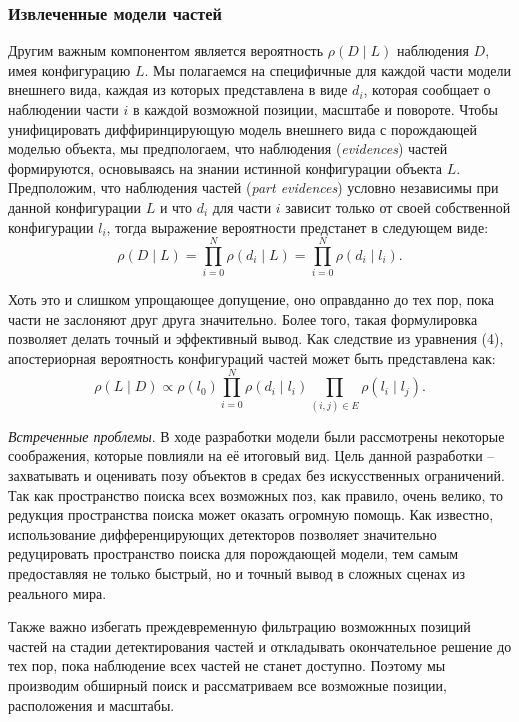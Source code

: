 \subsubsection{Извлеченные модели частей}

Другим важным компонентом является вероятность \(\rho(D{\mid}L)\) наблюдения \(D\), имея конфигурацию \(L\). Мы полагаемся на специфичные для каждой части модели внешнего вида, каждая из которых представлена в виде \(d_i\), которая сообщает о наблюдении части \(i\) в каждой возможной позиции, масштабе и повороте. Чтобы унифицировать диффиринцирующую модель внешнего вида с порождающей моделью объекта, мы предпологаем, что наблюдения (\emph{evidences}) частей формируются, основываясь на знании истинной конфигурации объекта \(L\). Предположим, что наблюдения частей (\emph{part evidences}) условно независимы при данной конфигурации \(L\) и что \(d_i\) для части \(i\) зависит только от своей собственной конфигурации \(l_i\), тогда выражение вероятности предстанет в следующем виде:
\begin{equation}
  \rho(D{\mid}L) = \prod_{i = 0}^N\rho(d_i{\mid}L) = \prod_{i = 0}^N\rho(d_i{\mid}l_i).
\end{equation}

Хоть это и слишком упрощающее допущение, оно оправданно до тех пор, пока части не заслоняют друг друга значительно. Более того, такая формулировка позволяет делать точный и эффективный вывод. Как следствие из уравнения (4), апостериорная вероятность конфигураций частей может быть представлена как:
\begin{equation}
  \rho(L{\mid}D) \propto \rho(l_0) \prod_{i = 0}^N\rho(d_i{\mid}l_i) \prod_{(i, j) \in E}\rho(l_i{\mid}l_j).
\end{equation}

\emph{Встреченные проблемы}. В ходе разработки модели были рассмотрены некоторые соображения, которые повлияли на её итоговый вид. Цель данной разработки -- захватывать и оценивать позу объектов в средах без искусственных ограничений. Так как пространство поиска всех возможных поз, как правило, очень велико, то редукция пространства поиска может оказать огромную помощь. Как известно, использование дифференцирующих детекторов позволяет значительно редуцировать пространство поиска для порождающей модели, тем самым предоставляя не только быстрый, но и точный вывод в сложных сценах из реального мира.

Также важно избегать преждевременную фильтрацию возможнных позиций частей на стадии детектирования частей и откладывать окончательное решение до тех пор, пока наблюдение всех частей не станет доступно. Поэтому мы производим обширный поиск и рассматриваем все возможные позиции, расположения и масштабы.

